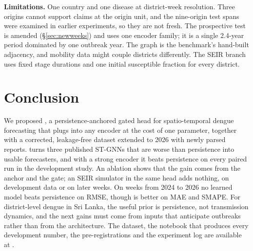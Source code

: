 \textbf{Limitations.} One country and one disease at district-week resolution. Three
origins cannot support claims at the origin unit, and the nine-origin test spans were
examined in earlier experiments, so they are not fresh. The prospective test is amended
(\S\ref{sec:newweeks}) and uses one encoder family; it is a single 2.4-year period
dominated by one outbreak year. The graph is the benchmark's hand-built adjacency, and
mobility data might couple districts differently. The SEIR branch uses fixed stage
durations and one initial susceptible fraction for every district.

\section{Conclusion}
We proposed \model{}, a persistence-anchored gated head for spatio-temporal dengue
forecasting that plugs into any encoder at the cost of one parameter, together with a
corrected, leakage-free dataset extended to 2026 with newly parsed reports. \model{} turns
three published ST-GNNs that are worse than persistence into usable forecasters, and
with a strong encoder it beats persistence on every paired run in the development
study. An ablation shows that the gain comes from the anchor and the gate; an SEIR
simulator in the same head adds nothing, on development data or on later weeks. On
weeks from 2024 to 2026 no learned model beats persistence on RMSE, though \model{} is
better on MAE and SMAPE. For district-level dengue in Sri Lanka, the useful prior is
persistence, not transmission dynamics, and the next gains must come from inputs that
anticipate outbreaks rather than from the architecture. The dataset, the notebook that
produces every development number, the pre-registrations and the experiment log are
available at \codeurl.
